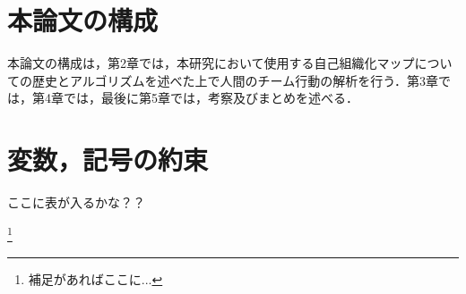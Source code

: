 %
\clearpage
\section{本論文の構成}
本論文の構成は，第2章では，本研究において使用する自己組織化マップについての歴史とアルゴリズムを述べた上で人間のチーム行動の解析を行う．第3章では，第4章では，最後に第5章では，考察及びまとめを述べる．

%
\clearpage
\section{変数，記号の約束}
ここに表が入るかな？？




  \footnote{
補足があればここに...
} %












